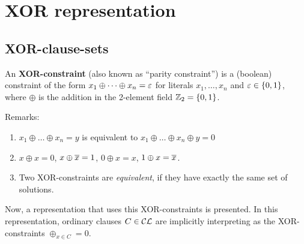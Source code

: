 \documentclass[]{book}
\begin{document}
\chapter{XOR representation}
\label{cha:XOR-representation}

\section{XOR-clause-sets}
\label{sec:xor-cls}

\begin{defi}\label{def:xor-const} 
      \cite{h8} An \textbf{XOR-constraint} (also known as ``parity constraint'') is a (boolean) constraint of the form $x_1 \oplus \dots \oplus x_n = \varepsilon$ 
	  for literals $x_1, \dots, x_n$ and $\varepsilon \in \{ 0,1 \}$, where $\oplus$ is the addition in the 2-element field $\mathbb{Z}_2 = \{ 0,1 \}$. 
\end{defi}
Remarks:
\begin{enumerate}
      \item $x_1 \oplus \dots \oplus x_n = y$ is equivalent to $x_1 \oplus \dots \oplus x_n \oplus y = 0$
	  \item $x \oplus x = 0$, $x \oplus \overline{x} = 1$, $0 \oplus x = x$, $1 \oplus x = \overline{x}$.
	  \item Two XOR-constraints are \emph{equivalent}, if they have exactly the same set of solutions.
\end{enumerate}
Now, a representation that uses  this XOR-constraints is presented.	In this representation, ordinary clauses $C \in \mathcal{CL}$ are 
implicitly interpreting as the XOR-constraints $\oplus_{x \in C} = 0$.  
\end{document}
